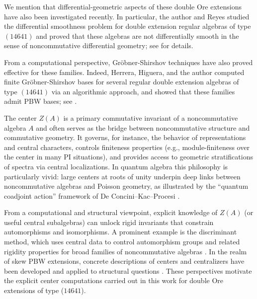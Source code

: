 \documentclass{amsart}
\theoremstyle{definition}
\theoremstyle{remark}
\numberwithin{equation}{section}
\begin{document}
We mention that differential-geometric aspects of these double Ore extensions have also been investigated recently. In particular, the author and Reyes studied the differential smoothness problem for double extension regular algebras of type $(14641)$ and proved that these algebras are not differentially smooth in the sense of noncommutative differential geometry; see \cite{RubianoReyes2024DSDoubleOreExtensions} for details.

From a computational perspective, Gr\"obner-Shirshov techniques have also proved effective for these families. Indeed, Herrera, Higuera, and the author computed finite Gr\"obner-Shirshov bases for several regular double extension algebras of type $(14641)$ via an algorithmic approach, and showed that these families admit PBW bases; see \cite{HerreraHigueraRubiano2025}.

The center $Z(A)$ is a primary commutative invariant of a noncommutative algebra $A$ and often serves as the bridge between noncommutative structure and commutative geometry. It governs, for instance, the behavior of representations and central characters, controls finiteness properties (e.g., module-finiteness over the center in many PI situations), and provides access to geometric stratifications of spectra via central localizations. In quantum algebra this philosophy is particularly vivid: large centers at roots of unity underpin deep links between noncommutative algebras and Poisson geometry, as illustrated by the ``quantum coadjoint action'' framework of De Concini--Kac--Procesi \cite{DeConciniKacProcesi1992}.

From a computational and structural viewpoint, explicit knowledge of $Z(A)$ (or useful central subalgebras) can unlock rigid invariants that constrain automorphisms and isomorphisms. A prominent example is the discriminant method, which uses central data to control automorphism groups and related rigidity properties for broad families of noncommutative algebras \cite{CekenPalmieriWangZhang2015, CekenPalmieriWangZhang2016}. In the realm of skew PBW extensions, concrete descriptions of centers and centralizers have been developed and applied to structural questions \cite{LezamaVenegas2020, TumwesigyeRichterSilvestrov2020}. These perspectives motivate the explicit center computations carried out in this work for double Ore extensions of type ($14641$).
\end{document}
